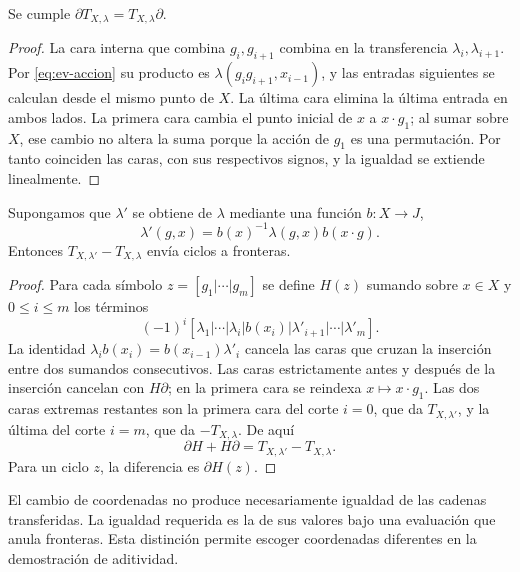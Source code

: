 \begin{lema}
\label{lem:ev-transferencia}
Se cumple $\partial T_{X,\lambda}=T_{X,\lambda}\partial$.
\end{lema}
\begin{proof}
La cara interna que combina $g_i,g_{i+1}$ combina en la transferencia $\lambda_i,\lambda_{i+1}$. Por \eqref{eq:ev-accion} su producto es $\lambda(g_i g_{i+1},x_{i-1})$, y las entradas siguientes se calculan desde el mismo punto de $X$. La última cara elimina la última entrada en ambos lados. La primera cara cambia el punto inicial de $x$ a $x\cdot g_1$; al sumar sobre $X$, ese cambio no altera la suma porque la acción de $g_1$ es una permutación. Por tanto coinciden las caras, con sus respectivos signos, y la igualdad se extiende linealmente.
\end{proof}

\begin{proposicion}
\label{prop:ev-cambio}
Supongamos que $\lambda'$ se obtiene de $\lambda$ mediante una función $b:X\to J$,
\begin{equation}
 \lambda'(g,x)=b(x)^{-1}\lambda(g,x)b(x\cdot g).
 \label{eq:ev-cambio}
\end{equation}
Entonces $T_{X,\lambda'}-T_{X,\lambda}$ envía ciclos a fronteras.
\end{proposicion}
\begin{proof}
Para cada símbolo $z=[g_1|\cdots|g_m]$ se define $H(z)$ sumando sobre $x\in X$ y $0\le i\le m$ los términos
\[
 (-1)^i[\lambda_1|\cdots|\lambda_i|b(x_i)|
          \lambda'_{i+1}|\cdots|\lambda'_m].
\]
La identidad $\lambda_i b(x_i)=b(x_{i-1})\lambda'_i$ cancela las caras que cruzan la inserción entre dos sumandos consecutivos. Las caras estrictamente antes y después de la inserción cancelan con $H\partial$; en la primera cara se reindexa $x\mapsto x\cdot g_1$. Las dos caras extremas restantes son la primera cara del corte $i=0$, que da $T_{X,\lambda'}$, y la última del corte $i=m$, que da $-T_{X,\lambda}$. De aquí
\begin{equation}
 \partial H+H\partial=T_{X,\lambda'}-T_{X,\lambda}.
 \label{eq:ev-homotopia}
\end{equation}
Para un ciclo $z$, la diferencia es $\partial H(z)$.
\end{proof}

El cambio de coordenadas no produce necesariamente igualdad de las cadenas transferidas. La igualdad requerida es la de sus valores bajo una evaluación que anula fronteras. Esta distinción permite escoger coordenadas diferentes en la demostración de aditividad.

